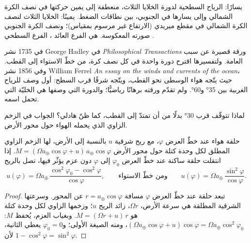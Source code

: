 \begin{omfigure}
{\small يسارًا: الرياح السطحية لدورة الخلايا الثلاث، منعطفة إلى يمين حركتها في نصف الكرة الشمالي وإلى يسارها في الجنوبي، بين نطاقات الضغط. يمينًا: الخلايا الثلاث لنصف الكرة الشمالي في مقطع ميريدي (الارتفاع غير مرسوم بمقياس)؛ ونصف الكرة الجنوبي صورته المعكوسة.  هي الفرع العائد ،  الفرع السطحي .}
\label{fig:b1:atmospheric-circulation:three-cells}
\end{omfigure}

\begin{history}
في 1735 نشر George Hadley في \emph{Philosophical Transactions} ورقة قصيرة عن سبب  العامة. ولتفسيرها اقترح دورة واحدة في كل نصف كرة، من خطّ الاستواء إلى القطب. وفي 1856 نشر William Ferrel \emph{An essay on the winds and currents of the ocean}، حيث يتّجه هواء  الوسطى نحو القطب، ويتّجه شرقًا قرب السطح: أول وصف للرياح الغربية بين \ang{35} و\ang{60}. ولم تقدّم ورقته برهانًا رياضيًّا؛ والدورة التي وصفها هي الخليّة التي تحمل اسمه.
\end{history}

لماذا تتوقّف  قرب \ang{30} بدلًا من أن تمتدّ إلى القطب، كما ظنّ هادلي؟ الجواب في الزخم الزاوي الذي يحمله الهواء حول محور الأرض.

\begin{proposition}\label{prop:b1:atmospheric-circulation:angular-momentum}
حلقة هواء عند خطّ العرض $\varphi$، مع ريح شرقية $u$ بالنسبة إلى الأرض، لها الزخم الزاوي المطلق لكل وحدة كتلة حول محور الأرض $M =
(\Omega a_\oplus\cos\varphi + u)\,a_\oplus\cos\varphi$. إذا انتقلت حلقة ساكنة عند خطّ العرض $\varphi_0$ إلى $\varphi$ دون عزم يؤثّر فيها، تصل بالريح
\[
  u(\varphi) = \Omega a_\oplus\,\frac{\cos^2\varphi_0 - \cos^2\varphi}{\cos\varphi},
  \qquad\text{ومن خطّ الاستواء}\qquad
  u(\varphi) = \Omega a_\oplus\,\frac{\sin^2\varphi}{\cos\varphi} .
\]
\end{proposition}

\begin{proof}
تبعد حلقة عند خطّ العرض $\varphi$ مسافة $r = a_\oplus\cos\varphi$ عن المحور. وسرعتها الشرقية المطلقة هي سرعة الأرض، $\Omega r$، زائد الريح $u$؛ وزخمها الزاوي لكل وحدة كتلة هو $M = (\Omega r + u)\,r$. وبغياب العزم، يُحفظ $M$: $(\Omega a_\oplus\cos\varphi + u)\cos\varphi = \Omega a_\oplus
\cos^2\varphi_0$، ومنه الصيغة الأولى؛ و$\varphi_0 = 0$ يعطي الثانية، لأن
$1 - \cos^2\varphi = \sin^2\varphi$.
\end{proof}

